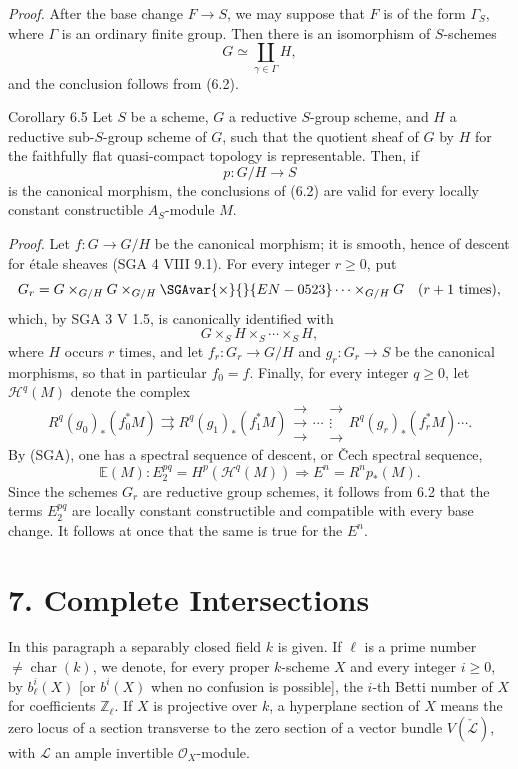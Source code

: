 \emph{Proof.} After the base change $F\to S$, we may suppose that $F$ is of the form $\Gamma_S$, where $\Gamma$ is an ordinary finite group. Then there is an isomorphism of $S$-schemes
\[
G\simeq\coprod_{\gamma\in\Gamma}H,
\]
and the conclusion follows from (6.2).

\begin{statement}{Corollary 6.5}
Let $S$ be a scheme, $G$ a reductive $S$-group scheme, and $H$ a reductive sub-$S$-group scheme of $G$, such that the quotient sheaf of $G$ by $H$ for the faithfully flat quasi-compact topology is representable. Then, if
\[
p:G/H\to S
\]
is the canonical morphism, the conclusions of (6.2) are valid for every locally constant constructible $A_S$-module $M$.
\end{statement}

\emph{Proof.} Let $f:G\to G/H$ be the canonical morphism; it is smooth, hence of descent for étale sheaves (SGA 4 VIII 9.1). For every integer $r\ge0$, put
\[
G_r=G\times_{G/H}G\times_{G/H}\SGAvar{\times}{}{EN-0523}\cdots\times_{G/H}G
\quad(r+1\text{ times}),
\]
which, by SGA 3 V 1.5, is canonically identified with
\[
G\times_S H\times_S\cdots\times_S H,
\]
where $H$ occurs $r$ times, and let $f_r:G_r\to G/H$ and $g_r:G_r\to S$ be the canonical morphisms, so that in particular $f_0=f$. Finally, for every integer $q\ge0$, let $\mathcal H^q(M)$ denote the complex
\[
R^q(g_0)_*(f_0^*M)\rightrightarrows R^q(g_1)_*(f_1^*M)\mathrel{\substack{\to\\\to\\\to}}\cdots\mathrel{\substack{\to\\\vdots\\\to}} R^q(g_r)_*(f_r^*M)\cdots .
\]
By (SGA), one has a spectral sequence of descent, or Čech spectral sequence,
\[
\mathbb E(M):E_2^{pq}=H^p(\mathcal H^q(M))\Rightarrow E^n=R^np_*(M).
\]
Since the schemes $G_r$ are reductive group schemes, it follows from 6.2 that the terms $E_2^{pq}$ are locally constant constructible and compatible with every base change. It follows at once that the same is true for the $E^n$.

\section*{7. Complete Intersections}

In this paragraph a separably closed field $k$ is given. If $\ell$ is a prime number $\ne\operatorname{char}(k)$, we denote, for every proper $k$-scheme $X$ and every integer $i\ge0$, by
$b_\ell^i(X)$ [or $b^i(X)$ when no confusion is possible], the $i$-th Betti number of $X$ for coefficients $\mathbb Z_\ell$. If $X$ is projective over $k$, a hyperplane section of $X$ means the zero locus of a section transverse to the zero section of a vector bundle $V(\check{\mathcal L})$, with $\mathcal L$ an ample invertible $\mathcal O_X$-module.

